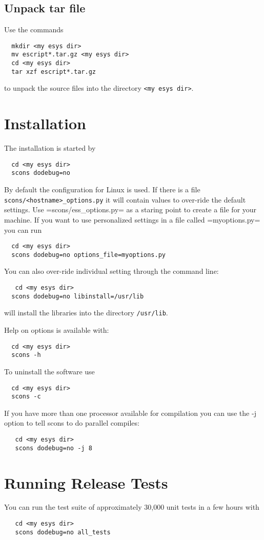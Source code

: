 \subsection{Unpack tar file}
  
Use the commands

\begin{verbatim}
  mkdir <my esys dir>
  mv escript*.tar.gz <my esys dir>
  cd <my esys dir>
  tar xzf escript*.tar.gz
\end{verbatim}

to unpack the source files into the directory \verb|<my esys dir>|.

\section{Installation}

The installation is started by 
\begin{verbatim}
  cd <my esys dir>
  scons dodebug=no
\end{verbatim}
By default the configuration for Linux is used. If there is a file \verb|scons/<hostname>_options.py| it will contain values to over-ride the default settings. Use =scons/ess_options.py= as a staring point to create a file for your machine. If you want to use personalized settings in a file called =myoptions.py= you can run
\begin{verbatim}
  cd <my esys dir>
  scons dodebug=no options_file=myoptions.py
\end{verbatim}
You can also over-ride individual setting through the command line:
\begin{verbatim}
   cd <my esys dir>
  scons dodebug=no libinstall=/usr/lib
\end{verbatim}
will install the libraries into the directory \verb|/usr/lib|. 

Help on options is available with:
\begin{verbatim}
  cd <my esys dir>
  scons -h
\end{verbatim}
To uninstall the software use
\begin{verbatim}
  cd <my esys dir>
  scons -c
\end{verbatim}

If you have more than one processor available for compilation you can use the -j option to tell scons to do parallel compiles:
\begin{verbatim}
   cd <my esys dir>
   scons dodebug=no -j 8
\end{verbatim}
\section{Running Release Tests}
You can run the test suite of approximately 30,000 unit tests in a few hours with
\begin{verbatim}
   cd <my esys dir>
   scons dodebug=no all_tests
\end{verbatim}

